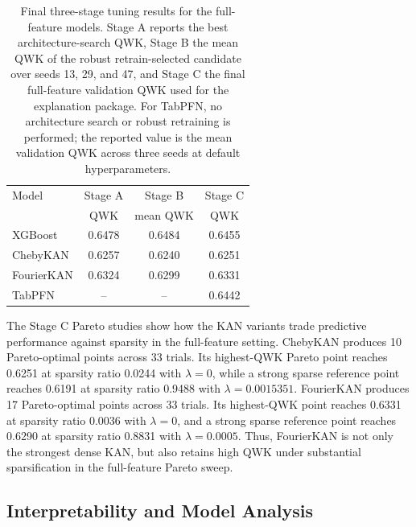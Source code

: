 \documentclass{article}
\begin{document}
\begin{table}[t]
\centering
\caption{Final three-stage tuning results for the full-feature models. Stage A reports the best architecture-search QWK, Stage B the mean QWK of the robust retrain-selected candidate over seeds 13, 29, and 47, and Stage C the final full-feature validation QWK used for the explanation package. For TabPFN, no architecture search or robust retraining is performed; the reported value is the mean validation QWK across three seeds at default hyperparameters.}
\label{tab:three_stage_tuning}
\footnotesize
\setlength{\tabcolsep}{4pt}
\begin{tabular}{lccc}
\hline
Model & Stage A & Stage B & Stage C \\
      & QWK & mean QWK & QWK \\
\hline
XGBoost    & 0.6478 & 0.6484 & 0.6455 \\
ChebyKAN   & 0.6257 & 0.6240 & 0.6251 \\
FourierKAN & 0.6324 & 0.6299 & 0.6331 \\
TabPFN     & --     & --     & 0.6442 \\
\hline
\end{tabular}
\end{table}

The Stage C Pareto studies show how the KAN variants trade predictive performance against sparsity in the full-feature setting. ChebyKAN produces 10 Pareto-optimal points across 33 trials. Its highest-QWK Pareto point reaches 0.6251 at sparsity ratio 0.0244 with $\lambda=0$, while a strong sparse reference point reaches 0.6191 at sparsity ratio 0.9488 with $\lambda=0.0015351$. FourierKAN produces 17 Pareto-optimal points across 33 trials. Its highest-QWK point reaches 0.6331 at sparsity ratio 0.0036 with $\lambda=0$, and a strong sparse reference point reaches 0.6290 at sparsity ratio 0.8831 with $\lambda=0.0005$. Thus, FourierKAN is not only the strongest dense KAN, but also retains high QWK under substantial sparsification in the full-feature Pareto sweep.

\subsection{Interpretability and Model Analysis}
\label{sec:interpretability}
\end{document}
